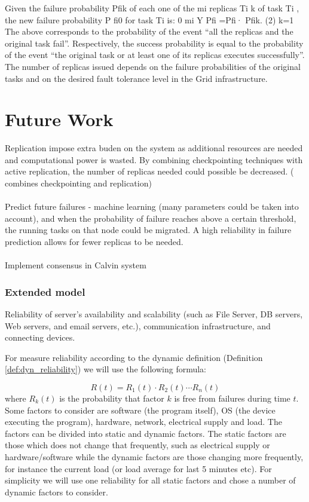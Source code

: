 \documentclass{cslthse-msc}
\begin{document}
Given the failure probability Pfik of each one of the mi replicas Ti k of task Ti , the new failure probability P fi0 for task Ti is:
0 mi Y
Pfi =Pfi· Pfik. (2) k=1
The above corresponds to the probability of the event “all the replicas and the original task fail”. Respectively, the success probability is equal to the probability of the event “the original task or at least one of its replicas executes successfully”. The number of replicas issued depends on the failure probabilities of the original tasks and on the desired fault tolerance level in the Grid infrastructure.  \cite{effTaskReplMobGrid}


\chapter{Future Work} \label{ch:future_work}
Replication impose extra buden on the system as additional resources are needed and computational power is wasted. By combining checkpointing techniques with active replication, the number of replicas needed could possible be decreased. (\cite{adaptiveCheckPointAndRep} combines checkpointing and replication)
\\\\
Predict future failures - machine learning (many parameters could be taken into account), and when the probability of failure reaches above a certain threshold, the running tasks on that node could be migrated. A high reliability in failure prediction allows for fewer replicas to be needed.
\\\\
Implement consensus in Calvin system

\subsection{Extended model}
Reliability of server’s availability and scalability (such as File Server, DB servers, Web servers, and email servers, etc.), communication infrastructure, and connecting devices. \cite{surveyReliabilityDistr}

For measure reliability according to the dynamic definition (Definition \ref{def:dyn_reliability}) we will use the following formula:

\begin{equation} \label{eq:overall_reliability}
R(t) = R_{1}(t) \cdot R_{2}(t) \cdots R_{n}(t)
\end{equation}
where $R_{k}(t)$ is the probability that factor $k$ is free from failures during time $t$. Some factors to consider are software (the program itself), OS (the device executing the program), hardware, network, electrical supply and load. The factors can be divided into static and dynamic factors. The static factors are those which does not change that frequently, such as electrical supply or hardware/software while the dynamic factors are those changing more frequently, for instance the current load (or load average for last 5 minutes etc). For simplicity we will use one reliability for all static factors and chose a number of dynamic factors to consider.
\end{document}

